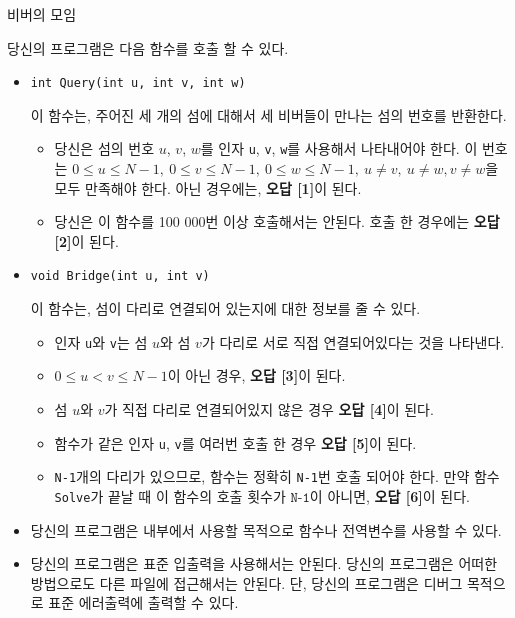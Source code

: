 \begin{problem}{비버의 모임}
\begin{itemize}
		당신의 프로그램은 다음 함수를 호출 할 수 있다.
		\begin{itemize}
			\item \texttt{int Query(int u, int v, int w)}
			
			이 함수는, 주어진 세 개의 섬에 대해서 세 비버들이 만나는 섬의 번호를 반환한다.
			
			\begin{itemize}
				\item 당신은 섬의 번호 $u$, $v$, $w$를 인자 \texttt{u}, \texttt{v}, \texttt{w}를 사용해서 나타내어야 한다. 이 번호는 $0 \le u \le N-1,\ 0 \le v \le N-1, \ 0 \le w \le N-1, \ u \ne v, \ u \ne w , v \ne w$을 모두 만족해야 한다. 아닌 경우에는, \textbf{오답 [1]}이 된다.
				
				\item 당신은 이 함수를 100 000번 이상 호출해서는 안된다. 호출 한 경우에는 \textbf{오답 [2]}이 된다.
			\end{itemize}
		
			\item \texttt{void Bridge(int u, int v)}
			
			이 함수는, 섬이 다리로 연결되어 있는지에 대한 정보를 줄 수 있다.
			
			\begin{itemize}
				\item 인자 \texttt{u}와 \texttt{v}는 섬 $u$와 섬 $v$가 다리로 서로 직접 연결되어있다는 것을 나타낸다.
				\item $0 \le u < v \le N-1$이 아닌 경우, \textbf{오답 [3]}이 된다.
				\item 섬 $u$와 $v$가 직접 다리로 연결되어있지 않은 경우 \textbf{오답 [4]}이 된다.
				\item 함수가 같은 인자 \texttt{u}, \texttt{v}를 여러번 호출 한 경우 \textbf{오답 [5]}이 된다.
				\item \texttt{N-1}개의 다리가 있으므로, 함수는 정확히 \texttt{N-1}번 호출 되어야 한다. 만약 함수 \texttt{Solve}가 끝날 때 이 함수의 호출 횟수가 $\texttt{N-1}$이 아니면, \textbf{오답 [6]}이 된다.
			\end{itemize}
		\end{itemize}
	
	
	\end{itemize}

	\Notes

	\begin{itemize}
		\item 당신의 프로그램은 내부에서 사용할 목적으로 함수나 전역변수를 사용할 수 있다.
		\item 당신의 프로그램은 표준 입출력을 사용해서는 안된다. 당신의 프로그램은 어떠한 방법으로도 다른 파일에 접근해서는 안된다. 단, 당신의 프로그램은 디버그 목적으로 표준 에러출력에 출력할 수 있다.
	\end{itemize}


\end{problem}
